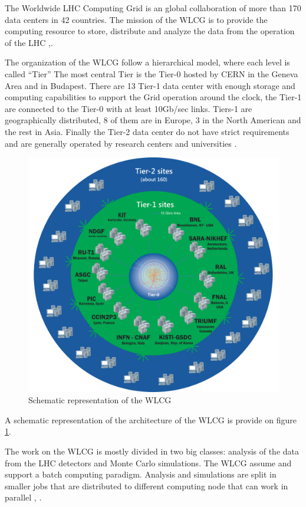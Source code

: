 The Worldwide LHC Computing Grid is an global collaboration of more than 170
data centers in 42 countries.  The mission of the WLCG is to provide the
computing resource to store, distribute and analyze the data from the operation
of the LHC \cite{grid:website},\cite{grid:report}.

The organization of the WLCG follow a hierarchical model, where each level is
called “Tier” The most central Tier is the Tier-0 hosted by CERN in the Geneva
Area and in Budapest. There are 13 Tier-1 data center with enough storage and
computing capabilities to support the Grid operation around the clock, the
Tier-1 are connected to the Tier-0 with at least 10Gb/sec links.  Tiers-1 are
geographically distributed, 8 of them are in Europe, 3 in the North American
and the rest in Asia. Finally the Tier-2 data center do not have strict
requirements and are generally operated by research centers and universities
\cite{grid:report}.

\begin{figure}
\includegraphics[width=\textwidth,height=\textheight,keepaspectratio]{gfx/WLCG}
\caption{Schematic representation of the WLCG}
\label{fig:wlcg-schema}
\end{figure}

A schematic representation of the architecture of the WLCG is provide on figure
\ref{fig:wlcg-schema}.


The work on the WLCG is mostly divided in two big classes: analysis of the data
from the LHC detectors and Monte Carlo simulations.  The WLCG assume and
support a batch computing paradigm. Analysis and simulations are split in
smaller jobs that are distributed to different computing node that can work in
parallel \cite{grid:report}, \cite{grid:update}.


